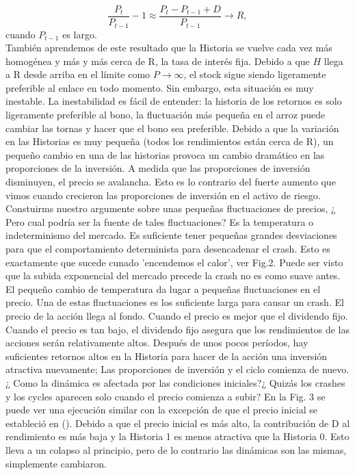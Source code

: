 \documentclass[12pt,a4paper]{article}
\begin{document}
$$
\frac{P_t}{P_{t-1}}-1\approx \frac{P_{t}-P_{t-1}+D}{P_{t-1}}\rightarrow R,
$$
cuando $P_{t-1}$ es largo.\\
\quad También aprendemos de este resultado que la Historia se vuelve cada vez más homogénea y más y más cerca de R, la tasa de interés fija. Debido a que $H$ llega a R desde arriba en el límite como $P\rightarrow \infty$, el stock sigue siendo ligeramente preferible al enlace en todo momento. Sin embargo, esta situación es muy inestable. La inestabilidad es fácil de entender: la historia de los retornos es solo ligeramente preferible al bono, la fluctuación más pequeña en el arroz puede cambiar las tornas y hacer que el bono sea preferible. Debido a que la variación en las Historias es muy pequeña (todos los rendimientos están cerca de R), un pequeño cambio en una de las historias provoca un cambio dramático en las proporciones de la inversión. A medida que las proporciones de inversión disminuyen, el precio se avalancha. Esto es lo contrario del fuerte aumento que vimos cuando crecieron las proporciones de inversión en el activo de riesgo.\\
\quad Constuirms nuestro argumente sobre unas pequeñas fluctuaciones de precios, ¿ Pero cual podría ser la fuente de tales fluctuaciones? Es la temperatura o indeterminismo del mercado. Es suficiente tener pequeñas grandes desviaciones para que el comportamiento determinista para desencadenar el crash. Esto es exactamente que sucede cunado 'encendemos el calor', ver Fig.2. Puede ser visto que la subida exponencial del mercado precede la crash no es como suave antes. El pequeño cambio de temperatura da lugar a pequeñas fluctuaciones en el precio. Una de estas fluctuaciones es los suficiente larga para causar un crash. El precio de la acción llega al fondo. Cuando el precio es mejor que el dividendo fijo. Cuando el precio es tan bajo, el dividendo fijo asegura que los rendimientos de las acciones serán relativamente altos. Después de unos pocos períodos, hay suficientes retornos altos en la Historia para hacer de la acción una inversión atractiva nuevamente; Las proporciones de inversión y el ciclo comienza de nuevo.\\
\quad ¿ Como la dinámica es afectada por las condiciones iniciales?¿ Quizás los crashes y los cycles aparecen solo cuando el precio comienza a subir? En la Fig. 3 se puede ver una ejecución similar con la excepción de que el precio inicial se estableció en (). Debido a que el precio inicial es más alto, la contribución de D al rendimiento es más baja y la Historia 1 es menos atractiva que la Historia 0. Esto lleva a un colapso al principio, pero de lo contrario las dinámicas son las mismas, simplemente cambiaron.\\
\end{document}
